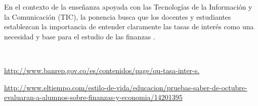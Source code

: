 \begin{titlepage}
\begin{minipage}{0.85\linewidth}
\begin{minipage}{0.85\linewidth}
\begin{resumen}
En el contexto de la ense\~nanza apoyada con las Tecnolog\'ias de la Informaci\'on y la Comunicaci\'on (TIC), la ponencia busca que los docentes y estudiantes establezcan la importancia de entender claramente las tasas de inter\'es como una necesidad y base para el estudio de las finanzas .

    \end{resumen}
\end{minipage}
\vspace*{5pt}\\
\footnotesize
%  
    
\end{minipage}
\vspace{5pt}
\begin{thebibliography}{99}
\url{ http://www.banrep.gov.co/es/contenidos/page/qu-tasa-inter-s.}

 \url{ http://www.eltiempo.com/estilo-de-vida/educacion/pruebas-saber-de-octubre-evaluaran-a-alumnos-sobre-finanzas-y-economia/14201395} 

\end{thebibliography}
\end{titlepage}
